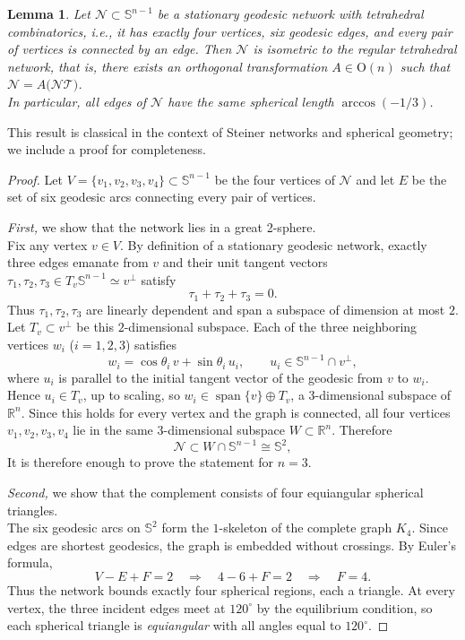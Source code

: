 \documentclass[11pt]{amsart}
\numberwithin{equation}{section}
\theoremstyle{theorem}
\newtheorem{lemma}[theorem]{Lemma}
\theoremstyle{definition}
\numberwithin{equation}{section}
\begin{document}
\begin{lemma}\label{lem: uniq. of RT-network}
Let $\mathcal{N} \subset \mathbb{S}^{n-1}$ be a stationary geodesic network with tetrahedral combinatorics, i.e., it has exactly four vertices, six geodesic edges, and every pair of vertices is connected by an edge. Then $\mathcal{N}$ is isometric to the regular tetrahedral network, that is, there exists an orthogonal transformation $A \in \mathrm{O}(n)$ such that
$
\mathcal{N} = A \bigl( \mathcal{NT} \bigr)$.\\
In particular, all edges of $\mathcal{N}$ have the same spherical length $\arccos(-1/3)$.
\end{lemma}
This result is classical in the context of Steiner networks and 
spherical geometry; we include a proof for completeness.
\begin{proof}
Let $V = \{v_1, v_2, v_3, v_4\} \subset \mathbb{S}^{n-1}$ be the four vertices of $\mathcal{N}$ and let $E$ be the set of six geodesic arcs connecting every pair of vertices.
\medskip

\textit{First,} we show that the network lies in a great 2-sphere. \\ 
Fix any vertex $v \in V$. By definition of a stationary geodesic network, exactly three edges emanate from $v$ and their unit tangent vectors $\tau_1, \tau_2, \tau_3 \in T_v \mathbb{S}^{n-1} \simeq v^\perp$ satisfy
\[
\tau_1 + \tau_2 + \tau_3 = 0.
\]
Thus $\tau_1, \tau_2, \tau_3$ are linearly dependent and span a subspace of dimension at most $2$. Let $T_v \subset v^\perp$ be this $2$-dimensional subspace. Each of the three neighboring vertices $w_i$ ($i=1,2,3$) satisfies
\[
w_i = \cos \theta_i \, v + \sin \theta_i \, u_i, \qquad u_i \in \mathbb{S}^{n-1} \cap v^\perp,
\]
where $u_i$ is parallel to the initial tangent vector of the geodesic from $v$ to $w_i$. Hence $u_i \in T_v$, up to scaling, so $w_i \in \operatorname{span}\{v\} \oplus T_v$, a $3$-dimensional subspace of $\mathbb{R}^n$. Since this holds for every vertex and the graph is connected, all four vertices $v_1,v_2,v_3,v_4$ lie in the same $3$-dimensional subspace $W \subset \mathbb{R}^n$. Therefore
\[
\mathcal{N} \subset W \cap \mathbb{S}^{n-1} \cong \mathbb{S}^2,
\]
It is therefore enough to prove the statement for $n=3$.
\medskip

\textit{Second,} we show that the complement consists of four equiangular spherical triangles. \\ 
The six geodesic arcs on $\mathbb{S}^2$ form the $1$-skeleton of the complete graph $K_4$. Since edges are shortest geodesics, the graph is embedded without crossings. By Euler's formula,
\[
V - E + F = 2 \quad \Rightarrow \quad 4 - 6 + F = 2 \quad \Rightarrow \quad F = 4.
\]
Thus the network bounds exactly four spherical regions, each a triangle. At every vertex, the three incident edges meet at $120^\circ$ by the equilibrium condition, so each spherical triangle is \emph{equiangular} with all angles equal to $120^\circ$.
\medskip



\end{proof}
\end{document}
